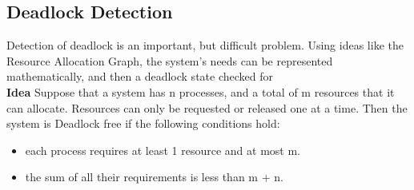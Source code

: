 \documentclass[a4paper, 10pt]{article}
\begin{document}
\subsection{Deadlock Detection}
Detection of deadlock is an important, but difficult problem. Using ideas like the Resource Allocation Graph, the system's needs can be represented mathematically, and then a deadlock state checked for\\[2ex]
\textbf{Idea}
Suppose that a system has n processes, and a total of m resources that it can allocate. Resources can only be requested or released one at a time. Then the system is Deadlock free if the following conditions hold:
\begin{itemize}
    \item each process requires at least 1 resource and at most m.
    \item the sum of all their requirements is less than m + n.
\end{itemize}
\end{document}
